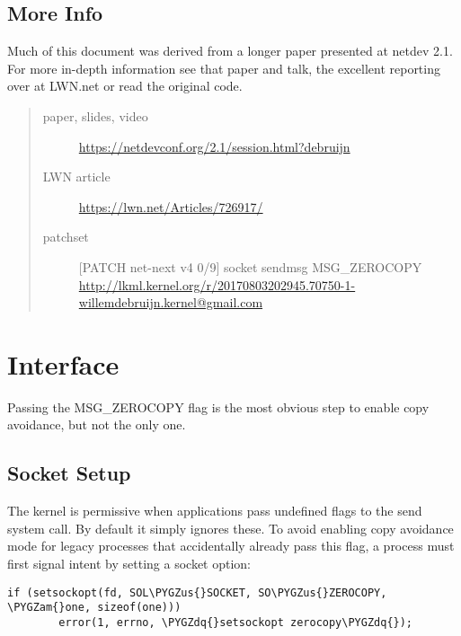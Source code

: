 \documentclass[a4paper,8pt,english]{sphinxmanual}
\def\PYGZus{\char`\_}
\def\PYGZam{\char`\&}
\def\PYGZdq{\char`\"}
\begin{document}
\subsection{More Info}
\label{networking/msg_zerocopy:more-info}
Much of this document was derived from a longer paper presented at
netdev 2.1. For more in-depth information see that paper and talk,
the excellent reporting over at LWN.net or read the original code.
\begin{quote}
\begin{description}
\item[{paper, slides, video}] \leavevmode
\href{https://netdevconf.org/2.1/session.html?debruijn}{https://netdevconf.org/2.1/session.html?debruijn}

\item[{LWN article}] \leavevmode
\href{https://lwn.net/Articles/726917/}{https://lwn.net/Articles/726917/}

\item[{patchset}] \leavevmode
{[}PATCH net-next v4 0/9{]} socket sendmsg MSG\_ZEROCOPY
\href{http://lkml.kernel.org/r/20170803202945.70750-1-willemdebruijn.kernel@gmail.com}{http://lkml.kernel.org/r/20170803202945.70750-1-willemdebruijn.kernel@gmail.com}

\end{description}
\end{quote}


\section{Interface}
\label{networking/msg_zerocopy:interface}
Passing the MSG\_ZEROCOPY flag is the most obvious step to enable copy
avoidance, but not the only one.


\subsection{Socket Setup}
\label{networking/msg_zerocopy:socket-setup}
The kernel is permissive when applications pass undefined flags to the
send system call. By default it simply ignores these. To avoid enabling
copy avoidance mode for legacy processes that accidentally already pass
this flag, a process must first signal intent by setting a socket option:

\begin{Verbatim}[commandchars=\\\{\}]
if (setsockopt(fd, SOL\PYGZus{}SOCKET, SO\PYGZus{}ZEROCOPY, \PYGZam{}one, sizeof(one)))
        error(1, errno, \PYGZdq{}setsockopt zerocopy\PYGZdq{});
\end{Verbatim}
\end{document}
